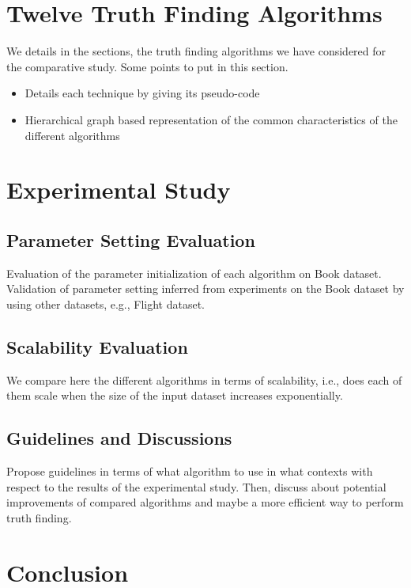 \documentclass{vldb}
\begin{document}
\section{Twelve Truth Finding Algorithms}
We details in the sections, the truth finding 
algorithms we have considered for the comparative study.
Some points to put in this section.
\begin{itemize}
 \item Details each technique by giving its pseudo-code
 \item Hierarchical graph based representation of the common characteristics of the different algorithms
\end{itemize}

\section{Experimental Study}
\subsection{Parameter Setting Evaluation}
Evaluation of the parameter initialization of each algorithm on Book dataset.
Validation of parameter setting inferred from experiments on the Book
dataset by using other datasets, e.g., Flight dataset. 

\subsection{Scalability Evaluation}
We compare here the different algorithms in terms of scalability, i.e., does each
of them scale when the size of the input dataset increases exponentially.

\subsection{Guidelines and Discussions}
Propose guidelines in terms of what algorithm to use in what contexts with respect to 
the results of the experimental study. Then, discuss about potential improvements of 
compared algorithms and maybe a more efficient way to perform truth finding.

\section{Conclusion}
\end{document}

